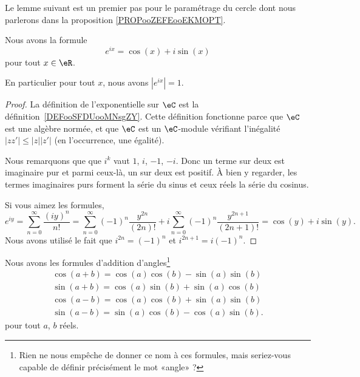 Le lemme suivant est un premier pas pour le paramétrage du cercle dont nous parlerons dans la proposition \ref{PROPooZEFEooEKMOPT}.
\begin{lemma}       \label{LEMooHOYZooKQTsXW}
    Nous avons la formule
    \begin{equation}        \label{EQooRVPJooTMwNTU}
        e^{ix}=\cos(x)+i\sin(x)
    \end{equation}
    pour tout \( x\in \eR\).

    En particulier pour tout \( x\), nous avons \( |  e^{ix} |=1\).
\end{lemma}

\begin{proof}
    La définition de l'exponentielle sur \( \eC\) est la définition~\ref{DEFooSFDUooMNsgZY}. Cette définition fonctionne parce que \( \eC\) est une algèbre normée, et que \( \eC\) est un \( \eC\)-module vérifiant l'inégalité \(  | zz' |\leq | z | |z' | \) (en l'occurrence, une égalité).

    Nous remarquons que que \( i^k\) vaut \( 1\), \( i\), \( -1\), \( -i\). Donc un terme sur deux est imaginaire pur et parmi ceux-là, un sur deux est positif. À bien y regarder, les termes imaginaires purs forment la série du sinus et ceux réels la série du cosinus.

    Si vous aimez les formules,
    \begin{equation}
            e^{iy}=\sum_{n=0}^{\infty}\frac{ (iy)^n }{ n! }
            =\sum_{n=0}^{\infty}(-1)^n\frac{ y^{2n} }{ (2n)! }+i\sum_{n=0}^{\infty}(-1)^n\frac{ y^{2n+1} }{ (2n+1)! }
            =\cos(y)+i\sin(y).
    \end{equation}
    Nous avons utilisé le fait que \( i^{2n}=(-1)^n\) et \( i^{2n+1}=i(-1)^n\).
\end{proof}

\begin{lemma}       \label{LEMooJAWBooJGfZIL}
    Nous avons les formules d'addition d'angles\footnote{Rien ne nous empêche de donner ce nom à ces formules, mais seriez-vous capable de définir précisément le mot «angle» ?}
    \begin{subequations}        \label{SUBEQSooFSSMooHcYwRc}
        \begin{align}
            \cos(a+b)=\cos(a)\cos(b)-\sin(a)\sin(b) \label{EQooJYEMooQaOMib}\\
            \sin(a+b)=\cos(a)\sin(b)+\sin(a)\cos(b) \label{EQooECAUooQzckDv}\\
            \cos(a-b)=\cos(a)\cos(b)+\sin(a)\sin(b) \label{EQooCVZAooQfocya}\\
            \sin(a-b)=\sin(a)\cos(b)-\cos(a)\sin(b).
        \end{align}
    \end{subequations}
    pour tout \( a\), \( b\) réels.
\end{lemma}

